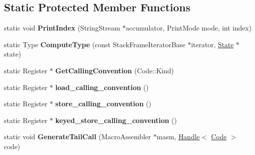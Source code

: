 \subsection*{Static Protected Member Functions}
\begin{DoxyCompactItemize}
\item 
\hypertarget{classv8_1_1internal_1_1_b_a_s_e___e_m_b_e_d_d_e_d_aab76dbe1bb677123a44e6769b1d1e58d}{}static void {\bfseries Print\+Index} (String\+Stream $\ast$accumulator, Print\+Mode mode, int index)\label{classv8_1_1internal_1_1_b_a_s_e___e_m_b_e_d_d_e_d_aab76dbe1bb677123a44e6769b1d1e58d}

\item 
\hypertarget{classv8_1_1internal_1_1_b_a_s_e___e_m_b_e_d_d_e_d_a44687861763a26f8e234de0679d29984}{}static Type {\bfseries Compute\+Type} (const Stack\+Frame\+Iterator\+Base $\ast$iterator, \hyperlink{structv8_1_1internal_1_1_b_a_s_e___e_m_b_e_d_d_e_d_1_1_state}{State} $\ast$state)\label{classv8_1_1internal_1_1_b_a_s_e___e_m_b_e_d_d_e_d_a44687861763a26f8e234de0679d29984}

\item 
\hypertarget{classv8_1_1internal_1_1_b_a_s_e___e_m_b_e_d_d_e_d_a8c9b9cbb55eb8f98222c86e745d16bd5}{}static Register $\ast$ {\bfseries Get\+Calling\+Convention} (Code\+::\+Kind)\label{classv8_1_1internal_1_1_b_a_s_e___e_m_b_e_d_d_e_d_a8c9b9cbb55eb8f98222c86e745d16bd5}

\item 
\hypertarget{classv8_1_1internal_1_1_b_a_s_e___e_m_b_e_d_d_e_d_a25dffe6eca20f7e917e54063860c5fad}{}static Register $\ast$ {\bfseries load\+\_\+calling\+\_\+convention} ()\label{classv8_1_1internal_1_1_b_a_s_e___e_m_b_e_d_d_e_d_a25dffe6eca20f7e917e54063860c5fad}

\item 
\hypertarget{classv8_1_1internal_1_1_b_a_s_e___e_m_b_e_d_d_e_d_afc8b4c7938eece51e57a1f03fe00aeda}{}static Register $\ast$ {\bfseries store\+\_\+calling\+\_\+convention} ()\label{classv8_1_1internal_1_1_b_a_s_e___e_m_b_e_d_d_e_d_afc8b4c7938eece51e57a1f03fe00aeda}

\item 
\hypertarget{classv8_1_1internal_1_1_b_a_s_e___e_m_b_e_d_d_e_d_ad84c51504d273066145e3f9cb1928ba1}{}static Register $\ast$ {\bfseries keyed\+\_\+store\+\_\+calling\+\_\+convention} ()\label{classv8_1_1internal_1_1_b_a_s_e___e_m_b_e_d_d_e_d_ad84c51504d273066145e3f9cb1928ba1}

\item 
\hypertarget{classv8_1_1internal_1_1_b_a_s_e___e_m_b_e_d_d_e_d_a5b15dfad519e750b245b1285062d5c92}{}static void {\bfseries Generate\+Tail\+Call} (Macro\+Assembler $\ast$masm, \hyperlink{classv8_1_1internal_1_1_handle}{Handle}$<$ \hyperlink{classv8_1_1internal_1_1_code}{Code} $>$ code)\label{classv8_1_1internal_1_1_b_a_s_e___e_m_b_e_d_d_e_d_a5b15dfad519e750b245b1285062d5c92}

\end{DoxyCompactItemize}
